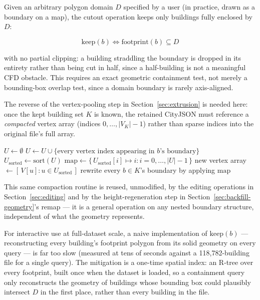 \documentclass[11pt]{article}
\begin{document}
Given an arbitrary polygon domain $D$ specified by a user (in practice, drawn as a boundary on
a map), the cutout operation keeps only buildings fully enclosed by $D$:

\begin{equation}
  \mathrm{keep}(b) \iff \mathrm{footprint}(b) \subseteq D
\end{equation}

with no partial clipping: a building straddling the boundary is dropped in its entirety rather
than being cut in half, since a half-building is not a meaningful CFD obstacle. This requires
an exact geometric containment test, not merely a bounding-box overlap test, since a domain
boundary is rarely axis-aligned.

The reverse of the vertex-pooling step in Section~\ref{sec:extrusion} is needed here: once the
kept building set $K$ is known, the retained CityJSON must reference a \emph{compacted}
vertex array (indices $0, \dots, |V_K|-1$) rather than sparse indices into the original file's
full array.

\begin{algorithm}[H]
\caption{Compact a subset of a CityJSON's geometry to a dense vertex range}
\begin{algorithmic}[1]
  \State $U \gets \emptyset$ 
    \State $U \gets U \cup \{\text{every vertex index appearing in } b\text{'s boundary}\}$
  \EndFor
  \State $U_{\text{sorted}} \gets \mathrm{sort}(U)$
  \State $\mathrm{map} \gets \{\, U_{\text{sorted}}[i] \mapsto i : i = 0,\dots,|U|-1 \,\}$
  \State new vertex array $\gets [\, V[u] : u \in U_{\text{sorted}} \,]$
  \State rewrite every $b \in K$'s boundary by applying $\mathrm{map}$
\EndFunction
\end{algorithmic}
\end{algorithm}

This same compaction routine is reused, unmodified, by the editing operations in
Section~\ref{sec:editing} and by the height-regeneration step in
Section~\ref{sec:backfill-geometry}'s remap --- it is a general operation on any nested
boundary structure, independent of what the geometry represents.

For interactive use at full-dataset scale, a naive implementation of $\mathrm{keep}(b)$ ---
reconstructing every building's footprint polygon from its solid geometry on every query ---
is far too slow (measured at tens of seconds against a 118{,}782-building file for a single
query). The mitigation is a one-time spatial index: an R-tree over every footprint, built once
when the dataset is loaded, so a containment query only reconstructs the geometry of buildings
whose bounding box could plausibly intersect $D$ in the first place, rather than every
building in the file.
\end{document}
